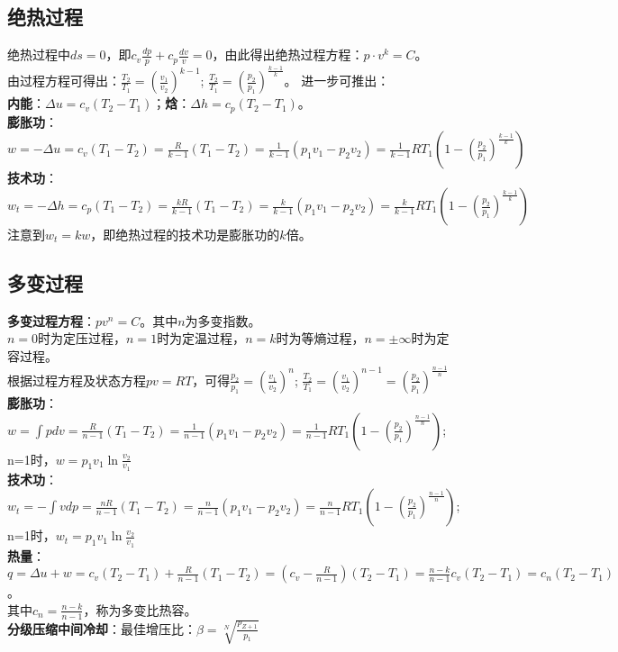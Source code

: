 \documentclass[a4paper,9pt]{ctexart}
\begin{document}
\subsection{绝热过程}
\noindent
绝热过程中$ds=0$，即$c_v\frac{dp}{p}+c_p\frac{dv}{v}=0$，由此得出绝热过程方程：$p\cdot v^k=C$。\\
由过程方程可得出：$\frac{T_2}{T_1}=\left(\frac{v_1}{v_2}\right)^{k-1}$; $\frac{T_2}{T_1}=\left(\frac{p_2}{p_1}\right)^{\frac{k-1}{k}}$。
进一步可推出：\\
\textbf{内能}：$\Delta u=c_v(T_2-T_1)$；\textbf{焓}：$\Delta h=c_p(T_2-T_1)$。\\
\textbf{膨胀功}：$w=-\Delta u=c_v(T_1-T_2)=\frac{R}{k-1}(T_1-T_2)=\frac{1}{k-1}(p_1v_1-p_2v_2)=\frac{1}{k-1}RT_1\left(1-(\frac{p_2}{p_1})^{\frac{k-1}{k}}\right)$\\
\textbf{技术功}：$w_t=-\Delta h=c_p(T_1-T_2)=\frac{kR}{k-1}(T_1-T_2)=\frac{k}{k-1}(p_1v_1-p_2v_2)=\frac{k}{k-1}RT_1\left(1-(\frac{p_2}{p_1})^{\frac{k-1}{k}}\right)$\\
注意到$w_t=kw$，即绝热过程的技术功是膨胀功的$k$倍。

\subsection{多变过程}
\noindent
\textbf{多变过程方程}：$pv^n=C$。其中$n$为多变指数。\\
$n=0$时为定压过程，$n=1$时为定温过程，$n=k$时为等熵过程，$n=\pm\infty$时为定容过程。\\
根据过程方程及状态方程$pv=RT$，可得$\frac{p_2}{p_1}=\left(\frac{v_1}{v_2}\right)^{n}$; $\frac{T_2}{T_1}=\left(\frac{v_1}{v_2}\right)^{n-1}=\left(\frac{p_2}{p_1}\right)^{\frac{n-1}{n}}$\\
\textbf{膨胀功}：$w=\int pdv=\frac{R}{n-1}(T_1-T_2)=\frac{1}{n-1}(p_1v_1-p_2v_2)=\frac{1}{n-1}RT_1\left(1-(\frac{p_2}{p_1})^{\frac{n-1}{n}}\right)$; n=1时，$w=p_1v_1\ln\frac{v_2}{v_1}$\\
\textbf{技术功}：$w_t=-\int vdp=\frac{nR}{n-1}(T_1-T_2)=\frac{n}{n-1}(p_1v_1-p_2v_2)=\frac{n}{n-1}RT_1\left(1-(\frac{p_2}{p_1})^{\frac{n-1}{n}}\right)$; n=1时，$w_t=p_1v_1\ln\frac{v_2}{v_1}$\\
\textbf{热量}：$q=\Delta u+w=c_v(T_2-T_1)+\frac{R}{n-1}(T_1-T_2)=(c_v-\frac{R}{n-1})(T_2-T_1)
=\frac{n-k}{n-1}c_v(T_2-T_1)=c_n(T_2-T_1)$。\\
其中$c_n=\frac{n-k}{n-1}$，称为多变比热容。\\
\textbf{分级压缩中间冷却}：最佳增压比：$\beta=\sqrt[N]{\frac{p_{Z+1}}{p_1}}$
\end{document}
